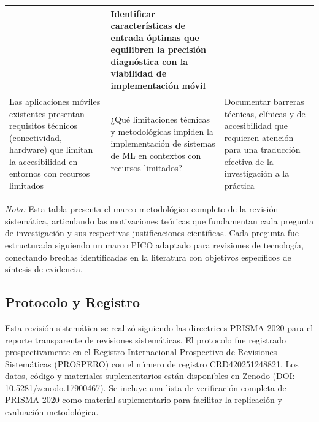 \documentclass{ieeeaccess}
\begin{document}
\begin{table}[htbp]
\begin{tabular}{|p{140pt}|p{160pt}|p{170pt}|}
			& Identificar características de entrada óptimas que equilibren la precisión diagnóstica con la viabilidad de implementación móvil \\
			\hline
			Las aplicaciones móviles existentes presentan requisitos técnicos (conectividad, hardware) que limitan la accesibilidad en entornos con recursos limitados 
			& ¿Qué limitaciones técnicas y metodológicas impiden la implementación de sistemas de ML en contextos con recursos limitados? 
			& Documentar barreras técnicas, clínicas y de accesibilidad que requieren atención para una traducción efectiva de la investigación a la práctica \\
			\hline
		\end{tabular}
		\begin{flushleft}
			\small \textit{Nota:} Esta tabla presenta el marco metodológico completo de la revisión sistemática, articulando las motivaciones teóricas que fundamentan cada pregunta de investigación y sus respectivas justificaciones científicas. Cada pregunta fue estructurada siguiendo un marco PICO adaptado para revisiones de tecnología, conectando brechas identificadas en la literatura con objetivos específicos de síntesis de evidencia.
		\end{flushleft}
	\end{table}

	
	\subsection{Protocolo y Registro}
	Esta revisión sistemática se realizó siguiendo las directrices PRISMA 2020 para el reporte transparente de revisiones sistemáticas. El protocolo fue registrado prospectivamente en el Registro Internacional Prospectivo de Revisiones Sistemáticas (PROSPERO) con el número de registro CRD420251248821. Los datos, código y materiales suplementarios están disponibles en Zenodo (DOI: 10.5281/zenodo.17900467). Se incluye una lista de verificación completa de PRISMA 2020 como material suplementario para facilitar la replicación y evaluación metodológica.
	
\end{document}
